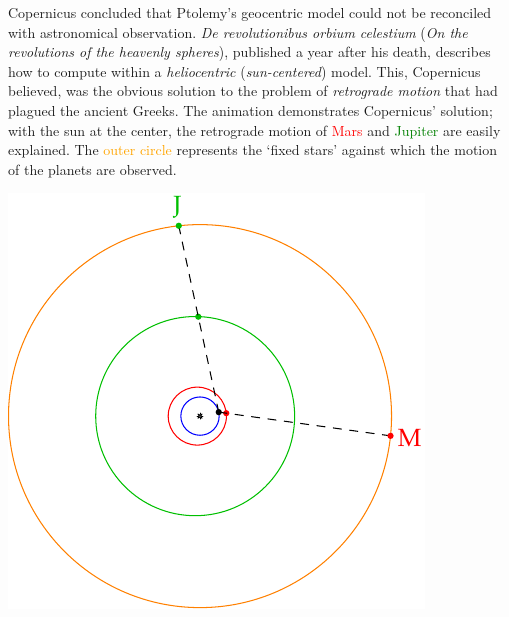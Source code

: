 \begin{minipage}[t]{0.69\linewidth}\vspace{0pt}
Copernicus concluded that Ptolemy's geocentric model could not be reconciled with astronomical observation. \emph{De revolutionibus orbium celestium} (\emph{On the revolutions of the heavenly spheres}), published a year after his death, describes how to compute within a \emph{heliocentric} (\emph{sun-centered}) model. This, Copernicus believed, was the obvious solution to the problem of \emph{retrograde motion} that had plagued the ancient Greeks.\footnotemark{}\smallbreak
The animation demonstrates Copernicus' solution; with the sun at the center, the retrograde motion of \textcolor{red}{Mars} and \textcolor{Green}{Jupiter} are easily explained. The \textcolor{orange}{outer circle} represents the `fixed stars' against which the motion of the planets are observed.
\end{minipage}\hfill\begin{minipage}[t]{0.3\linewidth}\vspace{-8pt}
\flushright\href{http://math.uci.edu/~ndonalds/math184/retrograde.html}{\includegraphics[scale=0.7]{retrograde-movie}}
\end{minipage}\par


